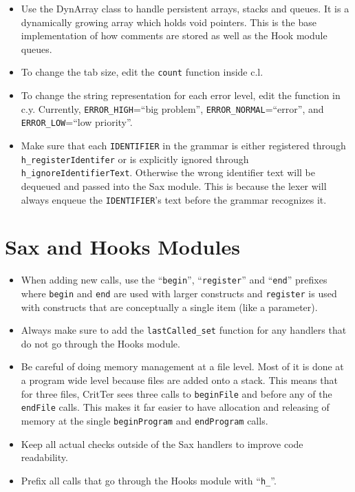 \documentclass[12pt]{report}
\newcommand{\programName}{CritTer\xspace}
\begin{document}
\begin{itemize}
\item Use the DynArray class to handle persistent arrays, stacks and queues. It is a dynamically growing array which holds void pointers. This is the base implementation of how comments are stored as well as the Hook module queues.
\item To change the tab size, edit the \lstinline{count} function inside c.l.
\item To change the string representation for each error level, edit the \lyyerror function in c.y. Currently, \lstinline{ERROR_HIGH}=``big problem'', \lstinline{ERROR_NORMAL}=``error'', and \lstinline{ERROR_LOW}=``low priority''.  
\item Make sure that each \lstinline{IDENTIFIER} in the grammar is either registered through \lstinline{h_registerIdentifer} or is explicitly ignored through \lstinline{h_ignoreIdentifierText}. Otherwise the wrong identifier text will be dequeued and passed into the Sax module. This is because the lexer will always enqueue the \lstinline{IDENTIFIER}'s text before the grammar recognizes it.
\end{itemize}

\section{Sax and Hooks Modules}

\begin{itemize}
\item When adding new calls, use the ``\lstinline{begin}'', ``\lstinline{register}'' and ``\lstinline{end}'' prefixes where \lstinline{begin} and \lstinline{end} are used with larger constructs and \lstinline{register} is used with constructs that are conceptually a single item (like a parameter).
\item Always make sure to add the \lstinline{lastCalled_set} function for any handlers that do not go through the Hooks module.
\item Be careful of doing memory management at a file level. Most of it is done at a program wide level because files are added onto a stack. This means that for three files, \programName sees three calls to \lstinline{beginFile} and before any of the \lstinline{endFile} calls. This makes it far easier to have allocation and releasing of memory at the single \lstinline{beginProgram} and \lstinline{endProgram} calls.
\item Keep all actual checks outside of the Sax handlers to improve code readability.
\item Prefix all calls that go through the Hooks module with ``\lstinline{h_}''.
\end{itemize}
\end{document}
